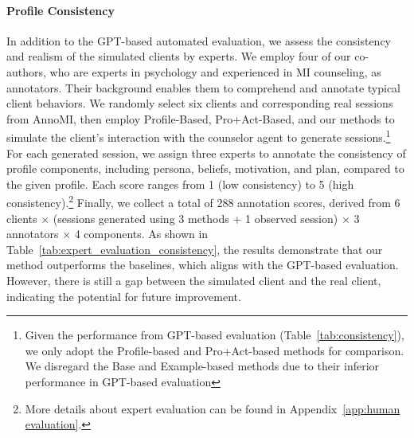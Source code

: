 \paragraph{Profile Consistency} In addition to the GPT-based automated evaluation, we assess the consistency and realism of the simulated clients by experts. We employ four of our co-authors, who are experts in psychology and experienced in MI counseling, as annotators. Their background enables them to comprehend and annotate typical client behaviors. We randomly select six clients and corresponding real sessions from AnnoMI, then employ Profile-Based, Pro+Act-Based, and our methods to simulate the client’s interaction with the counselor agent to generate sessions.\footnote{Given the performance from GPT-based evaluation (Table~\ref{tab:consistency}), we only adopt the Profile-based and Pro+Act-based methods for comparison. We disregard the Base and Example-based methods due to their inferior performance in GPT-based evaluation} For each generated session, we assign three experts to annotate the consistency of profile components, including persona, beliefs, motivation, and plan, compared to the given profile. Each score ranges from 1 (low consistency) to 5 (high consistency).\footnote{More details about expert evaluation can be found in Appendix~\ref{app:human evaluation}.} Finally, we collect a total of 288 annotation scores, derived from 6 clients $\times$ (sessions generated using 3 methods + 1 observed session) $\times$ 3 annotators $\times$ 4 components.  %
As shown in Table~\ref{tab:expert_evaluation_consistency}, the results demonstrate that our method outperforms the baselines, which aligns with the GPT-based evaluation. However, there is still a gap between the simulated client and the real client, indicating the potential for future improvement.

